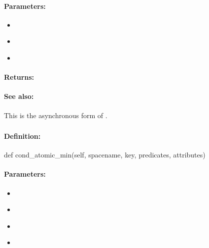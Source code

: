 \paragraph{Parameters:}
\begin{itemize}[noitemsep]
\item {}\\

\item {}\\

\item {}\\

\end{itemize}

\paragraph{Returns:}


\paragraph{See also:}  This is the asynchronous form of .

\pagebreak
\subsubsection{}
\label{api:python:cond_atomic_min}


\paragraph{Definition:}
\begin{pythoncode}
def cond_atomic_min(self, spacename, key, predicates, attributes)
\end{pythoncode}

\paragraph{Parameters:}
\begin{itemize}[noitemsep]
\item {}\\

\item {}\\

\item {}\\

\item {}\\

\end{itemize}

